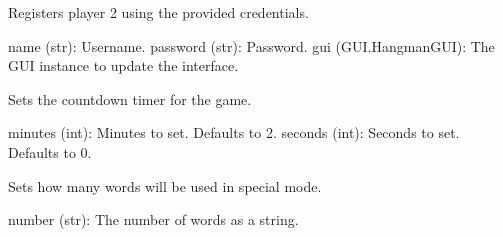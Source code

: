 \documentclass[letterpaper,10pt,english]{sphinxmanual}
\begin{document}
\begin{fulllineitems}
\label{\detokenize{modules:Game_Logic.register_player2}}
\pysigstartsignatures
{}
\pysigstopsignatures
\sphinxAtStartPar
Registers player 2 using the provided credentials.
\begin{description}
\sphinxAtStartPar
name (str): Username.
password (str): Password.
gui (GUI.HangmanGUI): The GUI instance to update the interface.

\end{description}

\end{fulllineitems}


\begin{fulllineitems}
\label{\detokenize{modules:Game_Logic.set_timer}}
\pysigstartsignatures
{}
\pysigstopsignatures
\sphinxAtStartPar
Sets the countdown timer for the game.
\begin{description}
\sphinxAtStartPar
minutes (int): Minutes to set. Defaults to 2.
seconds (int): Seconds to set. Defaults to 0.

\end{description}

\end{fulllineitems}


\begin{fulllineitems}
\label{\detokenize{modules:Game_Logic.set_word_number}}
\pysigstartsignatures
{}
\pysigstopsignatures
\sphinxAtStartPar
Sets how many words will be used in special mode.
\begin{description}
\sphinxAtStartPar
number (str): The number of words as a string.

\end{description}

\end{fulllineitems}
\end{document}
